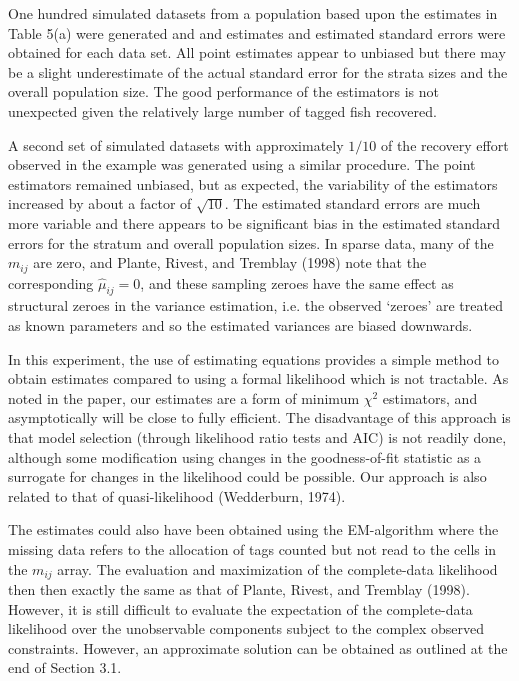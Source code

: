One hundred simulated datasets from a population based upon the
estimates in Table 5(a) were generated and
and estimates and estimated standard 
errors were obtained for each data set.
All point estimates appear to unbiased but
there may be a slight underestimate of the actual standard
error for the strata sizes and the overall population size.
The good performance of the estimators is not unexpected given the
relatively large number of tagged fish recovered.

A second set of simulated datasets with approximately $1/10$ of the recovery
effort observed in the example was generated using a similar procedure.
The point estimators remained unbiased, but as expected, the variability 
of the estimators increased by about a factor of $\sqrt{10}$. 
The estimated standard errors are
much more variable and there appears to be significant bias in the
estimated standard errors for the stratum and overall population sizes.
In sparse data, many of the $m_{ij}$ are
zero, and Plante, Rivest, and Tremblay (1998) note that the
corresponding $\hat{\mu}_{ij}=0$, and these sampling zeroes
have the same effect as structural zeroes in the variance estimation, i.e.
the observed `zeroes' are treated as
known parameters and so the estimated variances are
biased downwards. 



In this experiment, the use of estimating equations provides a
simple method to obtain estimates compared to using
a formal likelihood which is not tractable.
As noted in the paper, our estimates are a form of
minimum $\chi^2$ estimators, and asymptotically
will be close to fully efficient.
The disadvantage of this approach is that model
selection (through likelihood ratio tests and AIC) is
not readily done, although some modification
using changes in the goodness-of-fit statistic as a 
surrogate for changes in the likelihood could be
possible.
Our approach is also related to that of 
quasi-likelihood
(Wedderburn, 1974). 

The estimates could also have been obtained
using the EM-algorithm where the missing data
refers to the allocation of tags counted but not
read to the cells in the $m_{ij}$ array.
The evaluation and maximization of the complete-data
likelihood then then exactly the same as that
of Plante, Rivest, and Tremblay (1998). However,
it is still difficult to evaluate the expectation 
of the complete-data likelihood over the unobservable
components subject to the complex observed 
constraints. However, an approximate solution
can be obtained as outlined at the end of Section 3.1.

